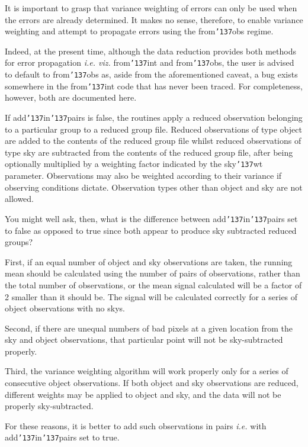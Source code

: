 \documentclass[a4paper]{book}
\renewcommand{\_}{{\tt\char'137}}
\begin{document}
It is important to grasp that variance weighting of errors can only be
used when the errors are already determined. It makes no sense, therefore,
to enable variance weighting and attempt to propagate errors using the
{\sc from\_obs} regime. 

Indeed, at the present time, although the data reduction provides both
methods for error propagation {\em i.e. viz.} {\sc from\_int} and {\sc
from\_obs}, the user is advised to default to {\sc from\_obs} as, aside from
the aforementioned caveat, a bug exists somewhere in the {\sc
from\_int} code that has never been traced. For completeness, however,
both are documented here. 

If add\_in\_pairs is {\sc false}, the routines apply a reduced observation
belonging to a particular group to a reduced group file.  Reduced
observations of type {\sc object} are added to the contents of the reduced
group file whilst reduced observations of type {\sc sky} are subtracted
from the contents of the reduced group file, after being optionally
multiplied by a weighting factor indicated by the sky\_wt parameter. 
Observations may also be weighted according to their variance if observing
conditions dictate. Observation types other than {\sc object} and {\sc
sky} are not allowed. 

You might well ask, then, what is the difference between add\_in\_pairs
set to {\sc false} as opposed to {\sc true} since both appear to produce
sky subtracted reduced groups? 

First, if an equal number of {\sc object} and {\sc sky} observations are
taken, the running mean should be calculated using the number of pairs of
observations, rather than the total number of observations, or the mean
signal calculated will be a factor of 2 smaller than it should be. The
signal will be calculated correctly for a series of {\sc object}
observations with no {\sc sky}s. 

Second, if there are unequal numbers of bad pixels at a given location
from the {\sc sky} and {\sc object} observations, that particular point
will not be sky-subtracted properly. 

Third, the variance weighting algorithm will work properly only for a
series of consecutive {\sc object} observations. If both {\sc object} and
{\sc sky} observations are reduced, different weights may be applied to
{\sc object} and {\sc sky}, and the data will not be properly
sky-subtracted. 

For these reasons, it is better to add such observations in pairs {\em
i.e.} with add\_in\_pairs set to {\sc true}. 
\end{document}
